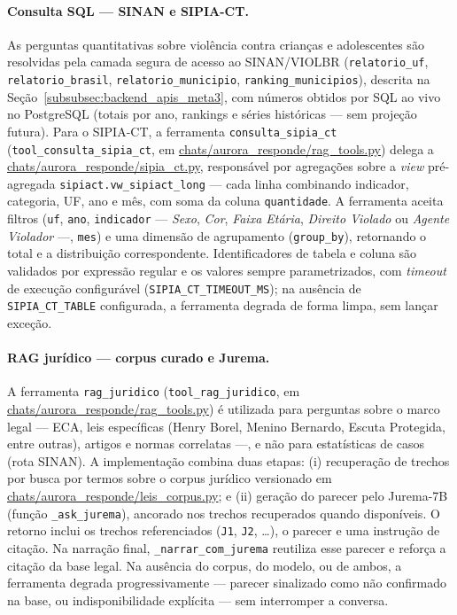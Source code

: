 \documentclass[11pt,a4paper]{article}
\begin{document}
\paragraph{Consulta SQL — SINAN e SIPIA-CT.} As perguntas quantitativas sobre violência contra crianças e adolescentes são resolvidas pela camada segura de acesso ao SINAN/VIOLBR (\texttt{relatorio\_uf}, \texttt{relatorio\_brasil}, \texttt{relatorio\_municipio}, \texttt{ranking\_municipios}), descrita na Seção~\ref{subsubsec:backend_apis_meta3}, com números obtidos por SQL ao vivo no PostgreSQL (totais por ano, rankings e séries históricas — sem projeção futura). Para o SIPIA-CT, a ferramenta \texttt{consulta\_sipia\_ct} (\texttt{tool\_consulta\_sipia\_ct}, em \url{chats/aurora_responde/rag_tools.py}) delega a \url{chats/aurora_responde/sipia_ct.py}, responsável por agregações sobre a \textit{view} pré-agregada \texttt{sipiact.vw\_sipiact\_long} — cada linha combinando indicador, categoria, UF, ano e mês, com soma da coluna \texttt{quantidade}. A ferramenta aceita filtros (\texttt{uf}, \texttt{ano}, \texttt{indicador} — \emph{Sexo}, \emph{Cor}, \emph{Faixa Etária}, \emph{Direito Violado} ou \emph{Agente Violador} —, \texttt{mes}) e uma dimensão de agrupamento (\texttt{group\_by}), retornando o total e a distribuição correspondente. Identificadores de tabela e coluna são validados por expressão regular e os valores sempre parametrizados, com \textit{timeout} de execução configurável (\texttt{SIPIA\_CT\_TIMEOUT\_MS}); na ausência de \texttt{SIPIA\_CT\_TABLE} configurada, a ferramenta degrada de forma limpa, sem lançar exceção.

\paragraph{RAG jurídico — corpus curado e Jurema.} A ferramenta \texttt{rag\_juridico} (\texttt{tool\_rag\_juridico}, em \url{chats/aurora_responde/rag_tools.py}) é utilizada para perguntas sobre o marco legal — ECA, leis específicas (Henry Borel, Menino Bernardo, Escuta Protegida, entre outras), artigos e normas correlatas —, e não para estatísticas de casos (rota SINAN). A implementação combina duas etapas: (i) recuperação de trechos por busca por termos sobre o corpus jurídico versionado em \url{chats/aurora_responde/leis_corpus.py}; e (ii) geração do parecer pelo Jurema-7B (função \texttt{\_ask\_jurema}), ancorado nos trechos recuperados quando disponíveis. O retorno inclui os trechos referenciados (\texttt{J1}, \texttt{J2}, \ldots), o parecer e uma instrução de citação. Na narração final, \texttt{\_narrar\_com\_jurema} reutiliza esse parecer e reforça a citação da base legal. Na ausência do corpus, do modelo, ou de ambos, a ferramenta degrada progressivamente — parecer sinalizado como não confirmado na base, ou indisponibilidade explícita — sem interromper a conversa.
\end{document}
